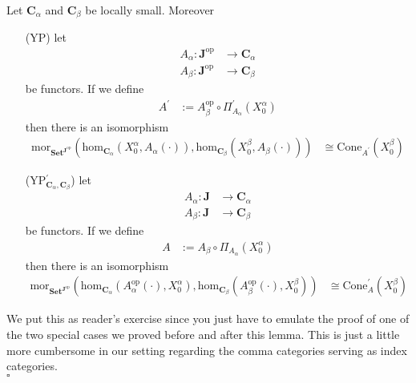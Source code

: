 \begin{lem}
\label{lem:genyonedaprobing}
Let $\mathbf{C}_{\alpha}$ and $\mathbf{C}_{\beta}$ be locally small. Moreover
\begin{enumerate}
\item[(YP)]
let
\begin{align*}
  A_{\alpha}
  \colon
  \mathbf{J}^{\textrm{op}}
  &\rightarrow
  \mathbf{C}_{\alpha}
  \\
  A_{\beta}
  \colon
  \mathbf{J}^{\textrm{op}}
  &\rightarrow
  \mathbf{C}_{\beta}
\end{align*}
be functors. If we define
\begin{align*}
  A^{\prime}
  &:=
  A_{\beta}^{\textrm{op}}
  \circ
  \Pi_{A_{\alpha}}^{\prime}(X_{0}^{\alpha})
\end{align*}
then there is an isomorphism
\begin{align*}
  \mathrm{mor}_{\mathbf{Set}^{\mathbf{J}^{\textrm{op}}}}
  \left(
    \mathrm{hom}_{\mathbf{C}_{\alpha}}
    \left(
      X_{0}^{\alpha},
      A_{\alpha}(\cdot)
    \right),
    \mathrm{hom}_{\mathbf{C}_{\beta}}
    \left(
      X_{0}^{\beta},
      A_{\beta}(\cdot)
    \right)
  \right)
  &\cong
  \mathrm{Cone}_{A^{\prime}}(X_{0}^{\beta})
\end{align*}
\item[(YP$_{\mathbf{C}_{\alpha},\mathbf{C}_{\beta}}^{\prime}$)]
let
\begin{align*}
  A_{\alpha}
  \colon
  \mathbf{J}
  &\rightarrow
  \mathbf{C}_{\alpha}
  \\
  A_{\beta}
  \colon
  \mathbf{J}
  &\rightarrow
  \mathbf{C}_{\beta}
\end{align*}
be functors. If we define
\begin{align*}
  A
  &:=
  A_{\beta}
  \circ
  \Pi_{A_{\alpha}}(X_{0}^{\alpha})
\end{align*}
then there is an isomorphism
\begin{align*}
  \mathrm{mor}_{\mathbf{Set}^{\mathbf{J}^{\textrm{op}}}}
  \left(
    \mathrm{hom}_{\mathbf{C}_{\alpha}}
    \left(
      A_{\alpha}^{\textrm{op}}(\cdot),
      X_{0}^{\alpha}
    \right),
    \mathrm{hom}_{\mathbf{C}_{\beta}}
    \left(
      A_{\beta}^{\textrm{op}}(\cdot),
      X_{0}^{\beta}
    \right)
  \right)
  &\cong
  \mathrm{Cone}_{A}^{\prime}(X_{0}^{\beta})
\end{align*}
\end{enumerate}
\end{lem}
\begin{prf}
We put this as reader's exercise since you just have to emulate the proof of one of the two special cases we proved before and after this lemma. This is just a little more cumbersome in our setting regarding the comma categories serving as index categories.
\\
\phantom{proven}
\hfill
$\square$
\end{prf}
